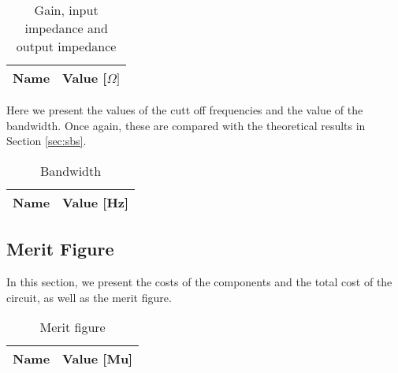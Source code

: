 \begin{table}[h]
  \centering
  \begin{tabular}{|l|r|}
    \hline    
    {\bf Name} & {\bf Value [$\Omega]$} \\ \hline
    
  \end{tabular}
  \caption{Gain, input impedance and output impedance}
  \label{tab:IN_out_sim}
\end{table}
\FloatBarrier
Here we present the values of the cutt off frequencies and the value of the bandwidth. Once again, these are compared with the theoretical results in Section \ref{sec:sbs}.


\begin{table}[h]
  \centering
  \begin{tabular}{|l|r|}
    \hline    
    {\bf Name} & {\bf Value [Hz]} \\ \hline
    
  \end{tabular}
  \caption{Bandwidth}
  \label{tab:Bandwith_sim}
\end{table}
\FloatBarrier

\subsection{Merit Figure}
In this section, we present the costs of the components and the total cost of the circuit, as well as the merit figure.

\begin{table}[h]
  \centering
  \begin{tabular}{|l|r|}
    \hline    
    {\bf Name} & {\bf Value [Mu]} \\ \hline
    
  \end{tabular}
  \caption{Merit figure}
  \label{tab:OP}
\end{table}
\FloatBarrier

